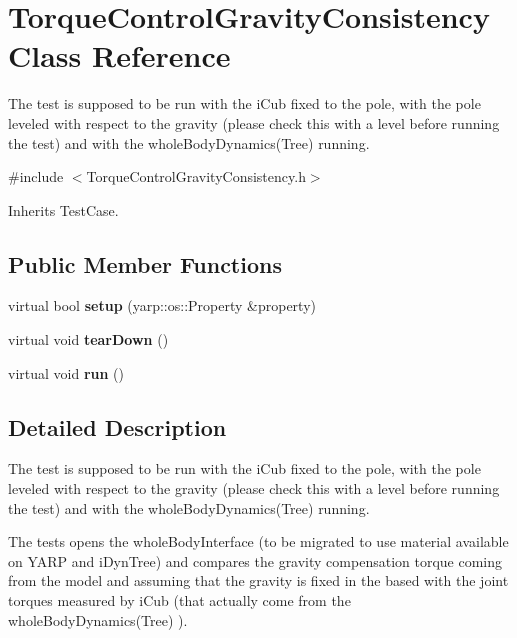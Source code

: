 \section{Torque\+Control\+Gravity\+Consistency Class Reference}
\label{classTorqueControlGravityConsistency}


The test is supposed to be run with the i\+Cub fixed to the pole, with the pole leveled with respect to the gravity (please check this with a level before running the test) and with the whole\+Body\+Dynamics(\+Tree) running.  




{\ttfamily \#include $<$Torque\+Control\+Gravity\+Consistency.\+h$>$}



Inherits Test\+Case.

\subsection*{Public Member Functions}
\begin{DoxyCompactItemize}
\item 
\mbox{\label{classTorqueControlGravityConsistency_af458d18b20938955516073ffbb9aeb8a}} 
virtual bool {\bfseries setup} (yarp\+::os\+::\+Property \&property)
\item 
\mbox{\label{classTorqueControlGravityConsistency_a530ffd6435bf66da62107510ef379c3b}} 
virtual void {\bfseries tear\+Down} ()
\item 
\mbox{\label{classTorqueControlGravityConsistency_a0a60459b300343fe929867703d38a8da}} 
virtual void {\bfseries run} ()
\end{DoxyCompactItemize}


\subsection{Detailed Description}
The test is supposed to be run with the i\+Cub fixed to the pole, with the pole leveled with respect to the gravity (please check this with a level before running the test) and with the whole\+Body\+Dynamics(\+Tree) running. 

The tests opens the whole\+Body\+Interface (to be migrated to use material available on Y\+A\+RP and i\+Dyn\+Tree) and compares the gravity compensation torque coming from the model and assuming that the gravity is fixed in the based with the joint torques measured by i\+Cub (that actually come from the whole\+Body\+Dynamics(\+Tree) ).

